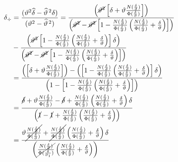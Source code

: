 \documentclass[11pt,twoside, spanish]{report} %
\begin{document}
\begin{equation}
	\begin{split}
		\delta_{\div} &= \frac{(\vartheta^2\widehat{\delta} - \widehat{\vartheta}^{\,2}\delta)}{(\vartheta^2 - \widehat{\vartheta}^{\,2})}
		= \frac{\left(\cancel{\vartheta^2} \left[\delta+\vartheta\frac{N(\frac{\delta}{\vartheta})}{\Phi(\frac{\delta}{\vartheta})}\right]  \right)}{\left(\cancel{\vartheta^2}- \cancel{\vartheta^2}\left[1-\frac{N(\frac{\delta}{\vartheta})}{\Phi(\frac{\delta}{\vartheta})}\left(\frac{N(\frac{\delta}{\vartheta})}{\Phi(\frac{\delta}{\vartheta})}+ \frac{\delta}{\vartheta}\right)\right] \right)}\\
		&- \frac{\left(\cancel{ \vartheta^2}\left[1-\frac{N(\frac{\delta}{\vartheta})}{\Phi(\frac{\delta}{\vartheta})}\left(\frac{N(\frac{\delta}{\vartheta})}{\Phi(\frac{\delta}{\vartheta})}+ \frac{\delta}{\vartheta}\right)\right] \delta\right)}{\left(\cancel{\vartheta^2}- \cancel{\vartheta^2}\left[1-\frac{N(\frac{\delta}{\vartheta})}{\Phi(\frac{\delta}{\vartheta})}\left(\frac{N(\frac{\delta}{\vartheta})}{\Phi(\frac{\delta}{\vartheta})}+ \frac{\delta}{\vartheta}\right)\right] \right)}\\
		&=\frac{\left(\left[\delta+\vartheta\frac{N(\frac{\delta}{\vartheta})}{\Phi(\frac{\delta}{\vartheta})}\right]  \right)-\left(\left[1-\frac{N(\frac{\delta}{\vartheta})}{\Phi(\frac{\delta}{\vartheta})}\left(\frac{N(\frac{\delta}{\vartheta})}{\Phi(\frac{\delta}{\vartheta})}+ \frac{\delta}{\vartheta}\right)\right] \delta\right)}{\left(1- \left[1-\frac{N(\frac{\delta}{\vartheta})}{\Phi(\frac{\delta}{\vartheta})}\left(\frac{N(\frac{\delta}{\vartheta})}{\Phi(\frac{\delta}{\vartheta})}+ \frac{\delta}{\vartheta}\right)\right] \right)} \\
		&=   \frac{\cancel{\delta}+\vartheta\frac{N(\frac{\delta}{\vartheta})}{\Phi(\frac{\delta}{\vartheta})} -\cancel{\delta}+\frac{N(\frac{\delta}{\vartheta})}{\Phi(\frac{\delta}{\vartheta})}\left(\frac{N(\frac{\delta}{\vartheta})}{\Phi(\frac{\delta}{\vartheta})}+ \frac{\delta}{\vartheta}\right) \delta}{\left(\cancel{1}- \cancel{1}+\frac{N(\frac{\delta}{\vartheta})}{\Phi(\frac{\delta}{\vartheta})}\left(\frac{N(\frac{\delta}{\vartheta})}{\Phi(\frac{\delta}{\vartheta})}+ \frac{\delta}{\vartheta}\right) \right)}\\
		&=   \frac{\vartheta\cancel{\frac{N(\frac{\delta}{\vartheta})}{\Phi(\frac{\delta}{\vartheta})}} +\cancel{\frac{N(\frac{\delta}{\vartheta})}{\Phi(\frac{\delta}{\vartheta})}}\left(\frac{N(\frac{\delta}{\vartheta})}{\Phi(\frac{\delta}{\vartheta})}+ \frac{\delta}{\vartheta}\right) \delta}  {\left(\cancel{\frac{N(\frac{\delta}{\vartheta})}{\Phi(\frac{\delta}{\vartheta_1})}}\left(\frac{N(\frac{\delta}{\vartheta})}{\Phi(\frac{\delta}{\vartheta})}+ \frac{\delta}{\vartheta}\right) \right)}

\end{split}
\end{equation}
\end{document}
